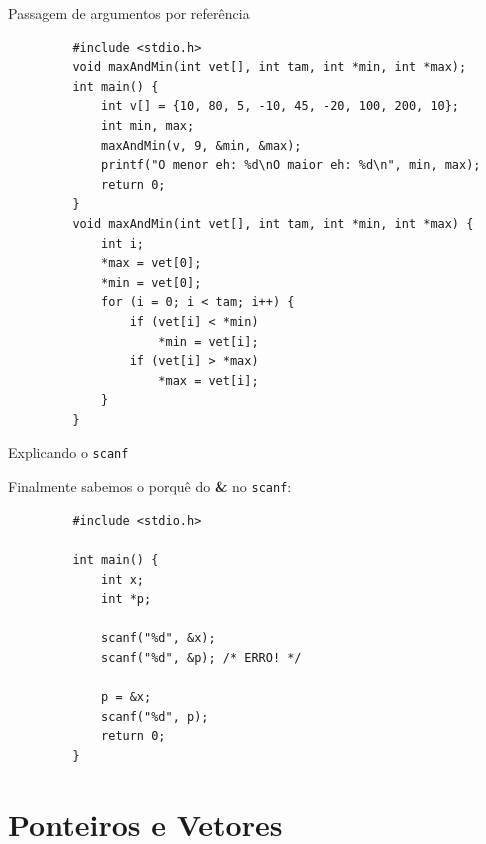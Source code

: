 \documentclass[handout]{beamer}
\newcommand{\cod}[1]{\texttt{#1}}
\begin{document}
\begin{frame}[fragile]{Passagem de argumentos por referência}
    \begin{verbatim}
         #include <stdio.h>
         void maxAndMin(int vet[], int tam, int *min, int *max);
         int main() {
             int v[] = {10, 80, 5, -10, 45, -20, 100, 200, 10};
             int min, max;
             maxAndMin(v, 9, &min, &max);
             printf("O menor eh: %d\nO maior eh: %d\n", min, max);
             return 0;
         }
         void maxAndMin(int vet[], int tam, int *min, int *max) {
             int i;
             *max = vet[0];
             *min = vet[0];
             for (i = 0; i < tam; i++) {
                 if (vet[i] < *min)
                     *min = vet[i];
                 if (vet[i] > *max)
                     *max = vet[i];
             }
         }
    \end{verbatim}
\end{frame}


\begin{frame}[fragile]{Explicando o \cod{scanf}}

    Finalmente sabemos o porquê do \textbf{\&} no \cod{scanf}:

    \begin{verbatim}
         #include <stdio.h>

         int main() {
             int x;
             int *p;

             scanf("%d", &x);
             scanf("%d", &p); /* ERRO! */

             p = &x;
             scanf("%d", p);
             return 0;
         }
    \end{verbatim}
\end{frame}



\section{Ponteiros e Vetores}
\end{document}

